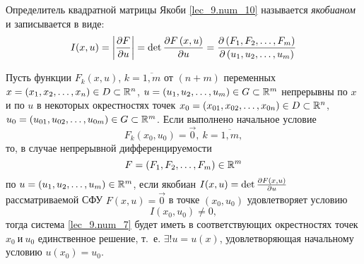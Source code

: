 \documentclass[../../main.tex]{subfiles}
\begin{document}
Определитель квадратной матрицы Якоби 
\eqref{lec_9.num_10} называется \emph{якобианом}
и записывается в виде:
\begin{equation}
    \label{lec_9.num_11}   
    I(x, u) = \left|\frac{\partial F}{\partial u}\right| = 
    \det\frac{\partial F\left(x,u\right)}{\partial u} =
    \frac{\partial \left(F_1,F_2,\dots,F_m\right)}{\partial \left(u_1, u_2,\dots, u_m\right)}
\end{equation}

\begin{thm}
Пусть функции $F_k\left(x, u\right)$, $k = \overline{1, m}$
от $(n+ m)$ переменных 
$x = \left(x_1, x_2, \dots, x_n\right) \in D \subset \mathbb{R}^n$,
$u = \left(u_1, u_2, \dots, u_m\right) \in G \subset \mathbb{R}^m$
непрерывны по $x$ и по $u$ в некоторых окрестностях точек
$x_0 = \left(x_{01}, x_{02}, \dots, x_{0n}\right) \in D 
\subset \mathbb{R}^n$,
$u_0 = \left(u_{01}, u_{02}, \dots, u_{0m}\right) \in G
\subset \mathbb{R}^m$. Если выполнено начальное условие
\begin{equation}
    \label{lec_9.num_12}
    F_k(x_0, u_0) = \vec{0},\ k = \overline{1, m},
\end{equation}
то, в случае непрерывной дифференцируемости
\begin{equation}
    \label{lec_9.num_13}
    F = \left(F_1, F_2, \dots, F_m\right) \in \mathbb{R}^m
\end{equation}
по $u = \left(u_1, u_2, \dots, u_m\right) \in \mathbb{R}^m$,
если якобиан
$I(x, u) = \det\frac{\partial F\left(x, u\right)}{\partial u}$
рассматриваемой СФУ $F\left(x, u\right) = \vec{0}$
в точке $\left(x_0, u_0\right)$ удовлетворяет условию
\begin{equation}
    \label{lec_9.num_14}
    I(x_0, u_0) \neq 0,
\end{equation}
тогда система \eqref{lec_9.num_7} будет иметь в 
соответствующих окрестностях точек $x_0\ \text{и}\ u_0$
единственное решение, т.~е. $\exists!u = u(x)$, удовлетворяющая начальному
 условию $u(x_0) = u_0$.
\end{thm}
\end{document}
